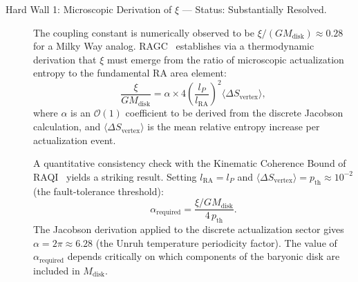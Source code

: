 \documentclass[11pt,a4paper]{article}
\theoremstyle{plain}
\theoremstyle{definition}
\theoremstyle{remark}
\begin{document}
\begin{description}
  \item[Hard Wall 1: Microscopic Derivation of $\xi$ --- Status: Substantially Resolved.]
  The coupling constant is numerically observed to be
  $\xi/(G M_{\mathrm{disk}}) \approx 0.28$ for a Milky Way analog.
  RAGC~\citep{Sandeman2026b} establishes via a thermodynamic derivation that
  $\xi$ must emerge from the ratio of microscopic actualization entropy to the
  fundamental RA area element:
  \begin{equation}
    \frac{\xi}{G M_{\mathrm{disk}}}
      = \alpha \times 4\!\left(\frac{l_P}{l_{\mathrm{RA}}}\right)^{\!2}
        \langle\Delta S_{\mathrm{vertex}}\rangle,
    \label{eq:xi_consistency}
  \end{equation}
  where $\alpha$ is an $\mathcal{O}(1)$ coefficient to be derived from the
  discrete Jacobson calculation, and $\langle\Delta S_{\mathrm{vertex}}\rangle$
  is the mean relative entropy increase per actualization event.

  A quantitative consistency check with the Kinematic Coherence Bound of
  RAQI~\citep{Sandeman2026d} yields a striking result. Setting
  $l_{\mathrm{RA}} = l_P$ and $\langle\Delta S_{\mathrm{vertex}}\rangle
  = p_{\mathrm{th}} \approx 10^{-2}$ (the fault-tolerance threshold):
  \begin{equation}
    \alpha_{\mathrm{required}} = \frac{\xi/GM_{\mathrm{disk}}}{4\,p_{\mathrm{th}}}.
    \label{eq:alpha_required}
  \end{equation}
  The Jacobson derivation applied to the discrete actualization sector gives
  $\alpha = 2\pi \approx 6.28$ (the Unruh temperature periodicity factor).
  The value of $\alpha_{\mathrm{required}}$ depends critically on which
  components of the baryonic disk are included in $M_{\mathrm{disk}}$.


\end{description}
\end{document}
